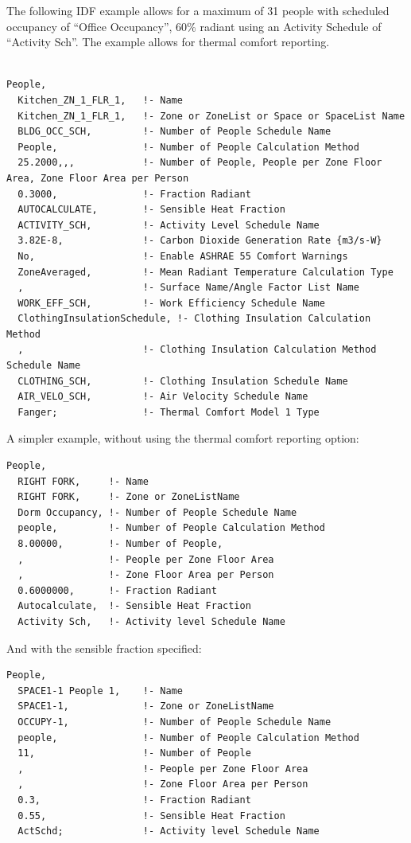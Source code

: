 The following IDF example allows for a maximum of 31 people with scheduled occupancy of ``Office Occupancy'', 60\% radiant using an Activity Schedule of ``Activity Sch''. The example allows for thermal comfort reporting.

\begin{lstlisting}

People,
  Kitchen_ZN_1_FLR_1,   !- Name
  Kitchen_ZN_1_FLR_1,   !- Zone or ZoneList or Space or SpaceList Name
  BLDG_OCC_SCH,         !- Number of People Schedule Name
  People,               !- Number of People Calculation Method
  25.2000,,,            !- Number of People, People per Zone Floor Area, Zone Floor Area per Person
  0.3000,               !- Fraction Radiant
  AUTOCALCULATE,        !- Sensible Heat Fraction
  ACTIVITY_SCH,         !- Activity Level Schedule Name
  3.82E-8,              !- Carbon Dioxide Generation Rate {m3/s-W}
  No,                   !- Enable ASHRAE 55 Comfort Warnings
  ZoneAveraged,         !- Mean Radiant Temperature Calculation Type
  ,                     !- Surface Name/Angle Factor List Name
  WORK_EFF_SCH,         !- Work Efficiency Schedule Name
  ClothingInsulationSchedule, !- Clothing Insulation Calculation Method
  ,                     !- Clothing Insulation Calculation Method Schedule Name
  CLOTHING_SCH,         !- Clothing Insulation Schedule Name
  AIR_VELO_SCH,         !- Air Velocity Schedule Name
  Fanger;               !- Thermal Comfort Model 1 Type
\end{lstlisting}

A simpler example, without using the thermal comfort reporting option:

\begin{lstlisting}
People,
  RIGHT FORK,     !- Name
  RIGHT FORK,     !- Zone or ZoneListName
  Dorm Occupancy, !- Number of People Schedule Name
  people,         !- Number of People Calculation Method
  8.00000,        !- Number of People,
  ,               !- People per Zone Floor Area
  ,               !- Zone Floor Area per Person
  0.6000000,      !- Fraction Radiant
  Autocalculate,  !- Sensible Heat Fraction
  Activity Sch,   !- Activity level Schedule Name
\end{lstlisting}

And with the sensible fraction specified:

\begin{lstlisting}
People,
  SPACE1-1 People 1,    !- Name
  SPACE1-1,             !- Zone or ZoneListName
  OCCUPY-1,             !- Number of People Schedule Name
  people,               !- Number of People Calculation Method
  11,                   !- Number of People
  ,                     !- People per Zone Floor Area
  ,                     !- Zone Floor Area per Person
  0.3,                  !- Fraction Radiant
  0.55,                 !- Sensible Heat Fraction
  ActSchd;              !- Activity level Schedule Name
\end{lstlisting}

